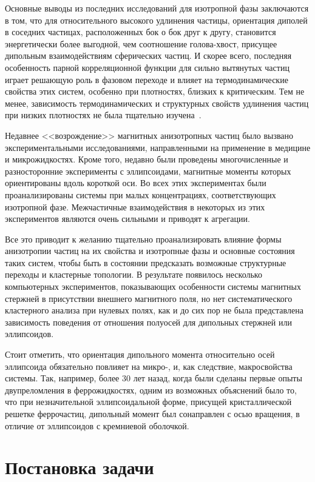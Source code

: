 \documentclass[a4paper,14pt]{extarticle}
\begin{document}
    Основные выводы из последних исследований для изотропной фазы
    заключаются в том, что для относительного высокого удлинения частицы, ориентация диполей в соседних частицах, расположенных бок о бок друг к другу, становится энергетически более выгодной, чем соотношение голова-хвост, присущее дипольным взаимодействиям сферических частиц. И скорее всего, последняя особенность парной корреляционной функции для сильно вытянутых частиц играет решающую роль в фазовом переходе и влияет на термодинамические свойства этих систем, особенно при плотностях, близких к критическим. Тем не менее, зависимость термодинамических и структурных свойств удлинения частиц при низких плотностях
    не была тщательно изучена~\cite{bib:two}.


    Недавнее <<возрождение>> магнитных анизотропных частиц было вызвано экспериментальными исследованиями, направленными на применение в медицине и микрожидкостях. Кроме того, недавно были проведены многочисленные и разносторонние эксперименты с эллипсоидами, магнитные моменты которых ориентированы вдоль короткой оси. Во всех этих экспериментах были проанализированы системы при малых концентрациях, соответствующих изотропной фазе. Межчастичные взаимодействия в некоторых из этих экспериментов являются очень сильными и приводят к агрегации.

    Все это приводит к желанию тщательно проанализировать влияние формы анизотропии частиц на их свойства и изотропные фазы и основные состояния таких систем, чтобы быть в состоянии предсказать возможные структурные переходы и кластерные топологии. В результате появилось несколько компьютерных экспериментов, показывающих особенности системы магнитных стержней в присутствии внешнего магнитного поля, но нет систематического кластерного анализа при нулевых полях, как и до сих пор не была представлена зависимость поведения от отношения полуосей
    для дипольных стержней или эллипсоидов.

    Стоит отметить, что ориентация дипольного момента относительно осей эллипсоида обязательно повлияет на микро-, и, как следствие, макросвойства системы. Так, например, более 30 лет назад, когда были сделаны первые опыты двупреломления в феррожидкостях, одним из возможных объяснений было то, что при незначительной эллипсоидальной форме, присущей кристаллической решетке феррочастиц, дипольный момент был сонаправлен с осью вращения, в отличие от эллипсоидов с кремниевой оболочкой.

    \newpage

    \section{Постановка задачи}
\end{document}
